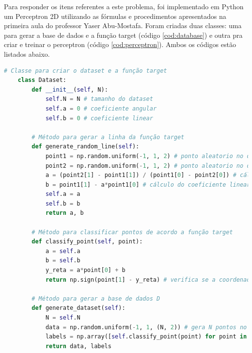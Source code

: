 Para responder os itens referentes a este problema, foi implementado em Python um Perceptron 2D utilizando as fórmulas e procedimentos apresentados na primeira aula do professor Yaser Abu-Mostafa. Foram criadas duas classes: uma para gerar a base de dados e a função target (código \ref{cod:database}) e outra pra criar e treinar o perceptron (código \ref{cod:perceptron}). Ambos os códigos estão listados abaixo.

\begin{lstlisting}[language=Python, caption=Geração do da base de dados $D$, label=cod:database]
    # Classe para criar o dataset e a função target
    class Dataset:
        def __init__(self, N): 
            self.N = N # tamanho do dataset
            self.a = 0 # coeficiente angular
            self.b = 0 # coeficiente linear
    
        # Método para gerar a linha da função target
        def generate_random_line(self):
            point1 = np.random.uniform(-1, 1, 2) # ponto aleatorio no domínio
            point2 = np.random.uniform(-1, 1, 2) # ponto aleatorio no domínio
            a = (point2[1] - point1[1]) / (point1[0] - point2[0]) # cálculo do coeficiente angular
            b = point1[1] - a*point1[0] # cálculo do coeficiente linear
            self.a = a
            self.b = b
            return a, b
    
        # Método para classificar pontos de acordo a função target
        def classify_point(self, point):
            a = self.a
            b = self.b
            y_reta = a*point[0] + b    
            return np.sign(point[1] - y_reta) # verifica se a coordenada y do ponto está acima ou abaixo da reta
    
        # Método para gerar a base de dados D
        def generate_dataset(self):
            N = self.N
            data = np.random.uniform(-1, 1, (N, 2)) # gera N pontos no R2 com coordenadas entre [-1, 1]
            labels = np.array([self.classify_point(point) for point in data])
            return data, labels
\end{lstlisting}

